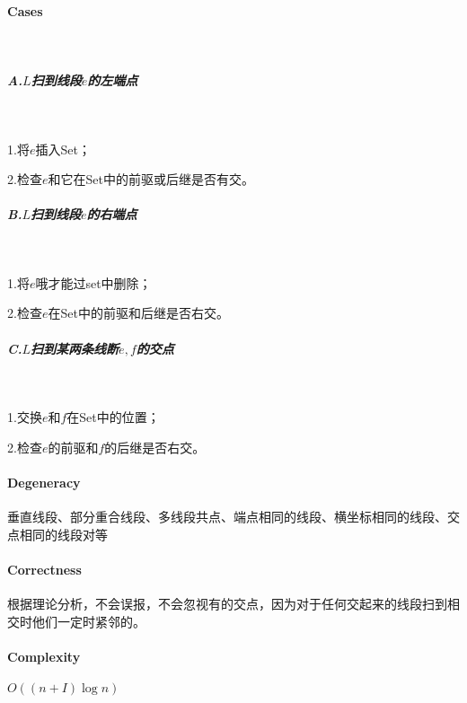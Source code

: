 \documentclass[12pt]{article}
\begin{document}
\begin{CJK*}{GBK}{song}
            \paragraph{Cases}\
                \subparagraph{A.$L$扫到线段$e$的左端点}\
                    \par 1.将$e$插入Set；
                    \par 2.检查$e$和它在Set中的前驱或后继是否有交。
                \subparagraph{B.$L$扫到线段$e$的右端点}\
                    \par 1.将$e$哦才能过set中删除；
                    \par 2.检查$e$在Set中的前驱和后继是否右交。
                \subparagraph{C.$L$扫到某两条线断$e,f$的交点}\
                    \par 1.交换$e$和$f$在Set中的位置；
                    \par 2.检查$e$的前驱和$f$的后继是否右交。
            \paragraph{Degeneracy}垂直线段、部分重合线段、多线段共点、端点相同的线段、横坐标相同的线段、交点相同的线段对等
            \paragraph{Correctness}根据理论分析，不会误报，不会忽视有的交点，因为对于任何交起来的线段扫到相交时他们一定时紧邻的。
            \paragraph{Complexity}$O((n+I)\log n)$
\end{CJK*}
\end{document}
